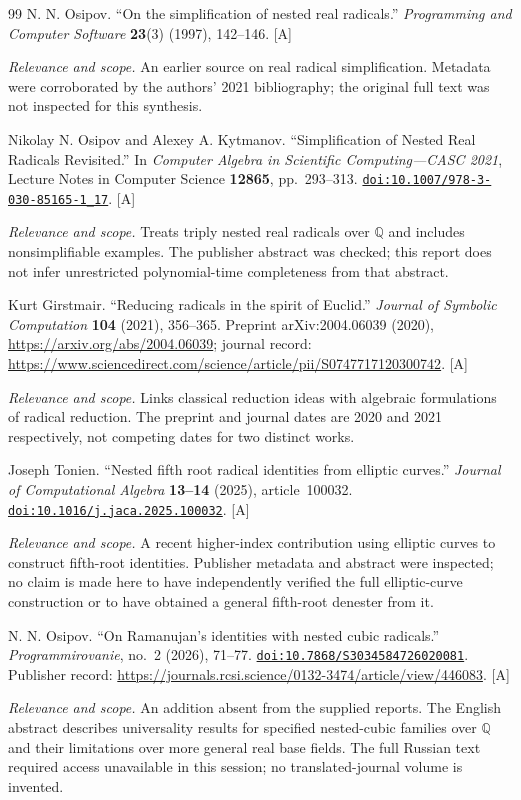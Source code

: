 \documentclass[11pt,letterpaper]{article}
\numberwithin{equation}{section}
\theoremstyle{definition}
\theoremstyle{remark}
\newcommand{\Q}{\mathbb{Q}}
\newcommand{\doi}[1]{\href{https://doi.org/#1}{\nolinkurl{doi:#1}}}
\newcommand{\status}[1]{\textsf{\small[#1]}}
\newcommand{\entrynote}[1]{\par\smallskip\noindent\emph{Relevance and scope.} #1}
\begin{document}
\begin{thebibliography}{99}
N. N. Osipov. ``On the simplification of nested real radicals.'' \emph{Programming and Computer Software} \textbf{23}(3) (1997), 142--146. \status{A}
\entrynote{An earlier source on real radical simplification. Metadata were corroborated by the authors' 2021 bibliography; the original full text was not inspected for this synthesis.}

Nikolay N. Osipov and Alexey A. Kytmanov. ``Simplification of Nested Real Radicals Revisited.'' In \emph{Computer Algebra in Scientific Computing---CASC 2021}, Lecture Notes in Computer Science \textbf{12865}, pp.~293--313. \doi{10.1007/978-3-030-85165-1_17}. \status{A}
\entrynote{Treats triply nested real radicals over $\Q$ and includes nonsimplifiable examples. The publisher abstract was checked; this report does not infer unrestricted polynomial-time completeness from that abstract.}

Kurt Girstmair. ``Reducing radicals in the spirit of Euclid.'' \emph{Journal of Symbolic Computation} \textbf{104} (2021), 356--365. Preprint arXiv:2004.06039 (2020), \url{https://arxiv.org/abs/2004.06039}; journal record: \url{https://www.sciencedirect.com/science/article/pii/S0747717120300742}. \status{A}
\entrynote{Links classical reduction ideas with algebraic formulations of radical reduction. The preprint and journal dates are 2020 and 2021 respectively, not competing dates for two distinct works.}

Joseph Tonien. ``Nested fifth root radical identities from elliptic curves.'' \emph{Journal of Computational Algebra} \textbf{13--14} (2025), article~100032. \doi{10.1016/j.jaca.2025.100032}. \status{A}
\entrynote{A recent higher-index contribution using elliptic curves to construct fifth-root identities. Publisher metadata and abstract were inspected; no claim is made here to have independently verified the full elliptic-curve construction or to have obtained a general fifth-root denester from it.}

N. N. Osipov. ``On Ramanujan's identities with nested cubic radicals.'' \emph{Programmirovanie}, no.~2 (2026), 71--77. \doi{10.7868/S3034584726020081}. Publisher record: \url{https://journals.rcsi.science/0132-3474/article/view/446083}. \status{A}
\entrynote{An addition absent from the supplied reports. The English abstract describes universality results for specified nested-cubic families over $\Q$ and their limitations over more general real base fields. The full Russian text required access unavailable in this session; no translated-journal volume is invented.}


\end{thebibliography}
\end{document}
